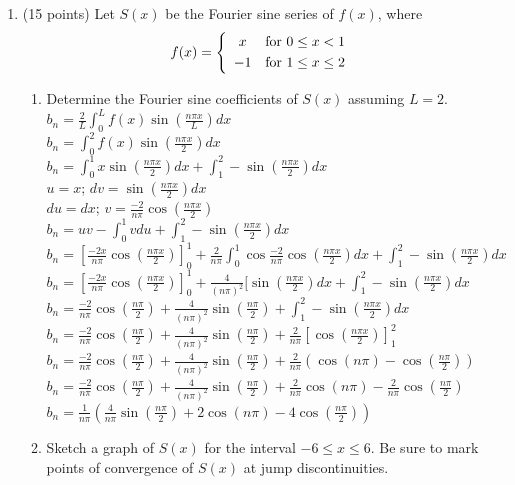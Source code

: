 \documentclass{article}
\begin{document}
\begin{enumerate}

\item (15 points)  Let $S(x)$ be the Fourier sine series of $f(x)$, where
\[
f(x)=\left\{
\begin{array}{cl}
x & \hbox{for $0\le x<1$}\smallskip\\
-1 & \hbox{for $1\le x\le 2$}
\end{array}
\right.
\]
\begin{enumerate}
\item Determine the Fourier sine coefficients of $S(x)$ assuming $L=2$.
\\$b_n=\frac{2}{L}\int_0^Lf(x)\sin(\frac{n\pi x}{L})dx$
\\$b_n=\int_0^2f(x)\sin(\frac{n\pi x}{2})dx$
\\$b_n=\int_0^1x\sin(\frac{n\pi x}{2})dx+\int_1^2-\sin(\frac{n\pi x}{2})dx$
\\$u=x$; $dv=\sin(\frac{n\pi x}{2})dx$
\\$du=dx$; $v=\frac{-2}{n\pi}\cos(\frac{n\pi x}{2})$
\\$b_n=uv-\int_0^1vdu+\int_1^2-\sin(\frac{n\pi x}{2})dx$
\\$b_n=[\frac{-2x}{n\pi}\cos(\frac{n\pi x}{2})]_0^1+\frac{2}{n\pi}\int_0^1\cos\frac{-2}{n\pi}\cos(\frac{n\pi x}{2})dx+\int_1^2-\sin(\frac{n\pi x}{2})dx$
\\$b_n=[\frac{-2x}{n\pi}\cos(\frac{n\pi x}{2})]_0^1+\frac{4}{(n\pi)^2}[\sin(\frac{n\pi x}{2})dx+\int_1^2-\sin(\frac{n\pi x}{2})dx$
\\$b_n=\frac{-2}{n\pi}\cos(\frac{n\pi}{2})+\frac{4}{(n\pi)^2}\sin(\frac{n\pi}{2})+\int_1^2-\sin(\frac{n\pi x}{2})dx$
\\$b_n=\frac{-2}{n\pi}\cos(\frac{n\pi}{2})+\frac{4}{(n\pi)^2}\sin(\frac{n\pi}{2})+\frac{2}{n\pi}[\cos(\frac{n\pi x}{2})]_1^2$
\\$b_n=\frac{-2}{n\pi}\cos(\frac{n\pi}{2})+\frac{4}{(n\pi)^2}\sin(\frac{n\pi}{2})+\frac{2}{n\pi}(\cos(n\pi)-\cos(\frac{n\pi}{2}))$
\\$b_n=\frac{-2}{n\pi}\cos(\frac{n\pi}{2})+\frac{4}{(n\pi)^2}\sin(\frac{n\pi}{2})+\frac{2}{n\pi}\cos(n\pi)-\frac{2}{n\pi}\cos(\frac{n\pi}{2})$
\\$b_n=\frac{1}{n\pi}(\frac{4}{n\pi}\sin(\frac{n\pi}{2})+2\cos(n\pi)-4\cos(\frac{n\pi}{2}))$
\item Sketch a graph of $S(x)$ for the interval $-6\le x\le6$.  Be sure to mark points of convergence of $S(x)$ at jump discontinuities.
\begin{figure}[h]
\centerline{}
\end{figure}
\end{enumerate}




\end{enumerate}
\end{document}
